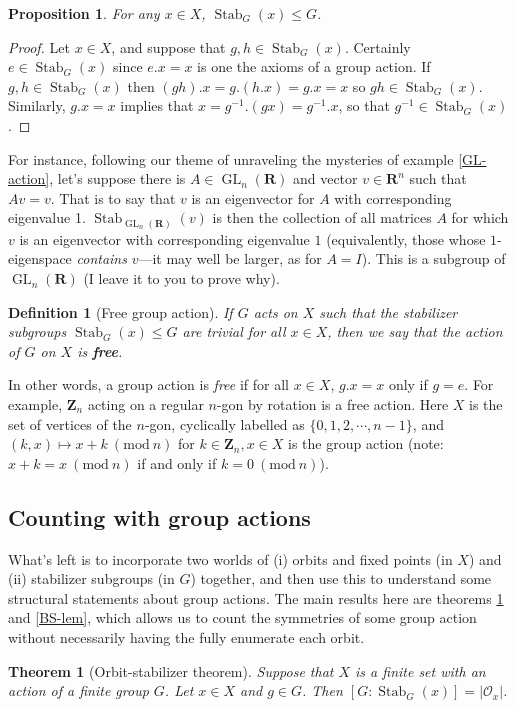 \documentclass[12pt]{article}
\numberwithin{equation}{subsection}
\newtheorem{thm}[subsection]{Theorem}
\newtheorem{prop}[subsection]{Proposition}
\newtheorem{defn}[subsection]{Definition}
\theoremstyle{note}
\newcommand{\Mod}[1]{\ (\mathrm{mod}\ #1)}
\newcommand{\GL}{\operatorname{GL}}
\newcommand{\Stab}{\operatorname{Stab}}
\begin{document}
\begin{prop} 
	For any $x\in X$, $\Stab_G(x)\leq G$. 
\end{prop}

\begin{proof} Let $x\in X$, and suppose that $g,h\in \Stab_G(x)$. Certainly $e\in \Stab_G(x)$ since $e.x=x$ is one the axioms of a group action. If $g,h\in \Stab_G(x)$ then $(gh).x=g.(h.x)=g.x=x$ so $gh\in \Stab_G(x)$. Similarly, $g.x=x$ implies that $x=g^{-1}.(gx)=g^{-1}.x$, so that $g^{-1}\in \Stab_G(x)$. 
\end{proof}

For instance, following our theme of unraveling the mysteries of example \ref{GL-action}, let's suppose there is $A\in \GL_n(\mathbf{R})$ and  vector $v\in \mathbf{R}^n$ such that $Av=v$. That is to say that $v$ is an eigenvector for $A$ with corresponding eigenvalue 1. $\Stab_{\GL_n(\mathbf{R})}(v)$ is then the collection of all matrices $A$ for which $v$ is an eigenvector with corresponding eigenvalue $1$ (equivalently, those whose $1$-eigenspace \textit{contains} $v$---it may well be larger, as for $A=I$). This is a subgroup of $\GL_n(\mathbf{R})$ (I leave it to you to prove why). 
\begin{defn}[Free group action]
	If $G$ acts on $X$ such that  the stabilizer subgroups $\Stab_G(x)\leq G$ are trivial for all $x\in X$, then we say that the action of $G$ on $X$ is \textbf{free}.
\end{defn}

In other words, a group action is \textit{free} if for all $x\in X$, $g.x=x$ only if $g=e$. For example, $\mathbf{Z}_n$ acting on a regular $n$-gon by rotation is a free action. Here $X$ is the set of vertices of the $n$-gon, cyclically labelled as $\{0,1,2,\cdots,n-1\}$, and $(k,x)\mapsto x+k\Mod{n}$ for $k\in \mathbf{Z}_n, x\in X$ is the group action (note: $x+k=x\Mod{n}$ if and only if $k=0\Mod{n}$).


\subsection{Counting with group actions}

What's left is to incorporate two worlds of (i) orbits and fixed points (in $X$) and (ii) stabilizer subgroups (in $G$) together, and then use this to understand some structural statements about group actions. The main results here are theorems \ref{orb-stab} and \ref{BS-lem}, which allows us to count the symmetries of some group action without necessarily having the fully enumerate each orbit.
\begin{thm}[Orbit-stabilizer theorem] \label{orb-stab}
	Suppose that $X$ is a finite set with an action of a finite group $G$. Let $x\in X$ and $g\in G$. Then $[ G: \Stab_G(x)]=|\mathcal{O}_x|$.
\end{thm}
\end{document}
